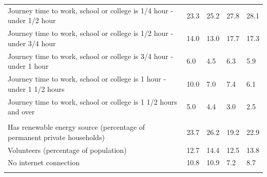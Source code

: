 \documentclass{article}
\begin{document}
\begin{table}[h]
\begin{tabular}{KTTTT}
Journey time to work, school or college is 1/4 hour - under 1/2 hour & 23.3& 25.2& 27.8& 28.1\\
Journey time to work, school or college is 1/2 hour - under 3/4 hour & 14.0& 13.0& 17.7& 17.3\\
Journey time to work, school or college is 3/4 hour - under 1 hour & 6.0& 4.5& 6.3& 5.9\\
Journey time to work, school or college is 1 hour - under 1 1/2 hours & 10.0&  7.0&  7.4&  6.1\\
Journey time to work, school or college is 1 1/2 hours and over & 5.0& 4.4& 3.0& 2.5\\
\hline
    \\ 
    \hline
Has renewable energy source (percentage of permanent private households) & 23.7& 26.2& 19.2& 22.9\\
    \hline
Volunteers (percentage of population) & 12.7& 14.4& 12.5& 13.8\\
    \hline
No internet connection& 10.8& 10.9&  7.2&  8.7\\
\hline
\end{tabular}
\end{table}
\end{document}
